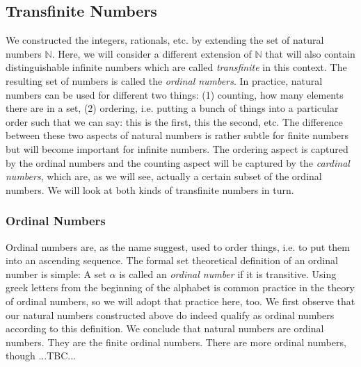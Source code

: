 





\subsection{Transfinite Numbers}
We constructed the integers, rationals, etc. by extending the set of natural numbers $\mathbb{N}$. Here, we will consider a different extension of $\mathbb{N}$ that will also contain distinguishable infinite numbers which are called \emph{transfinite} in this context. The resulting set of numbers is called the \emph{ordinal numbers}. In practice, natural numbers can be used for different two things: (1) counting, how many elements there are in a set, (2) ordering, i.e. putting a bunch of things into a particular order such that we can say: this is the first, this the second, etc. The difference between these two aspects of natural numbers is rather subtle for finite numbers but will become important for infinite numbers. The ordering aspect is captured by the ordinal numbers and the counting aspect will be captured by the \emph{cardinal numbers}, which are, as we will see, actually a certain subset of the ordinal numbers. We will look at both kinds of transfinite numbers in turn.





\subsubsection{Ordinal Numbers}
Ordinal numbers are, as the name suggest, used to order things, i.e. to put them into an ascending sequence. The formal set theoretical definition of an ordinal number is simple: A set $\alpha$ is called an \emph{ordinal number} if it is transitive. Using greek letters from the beginning of the alphabet is common practice in the theory of ordinal numbers, so we will adopt that practice here, too. We first observe that our natural numbers constructed above do indeed qualify as ordinal numbers according to this definition. We conclude that natural numbers are ordinal numbers. They are the finite ordinal numbers. There are more ordinal numbers, though ...TBC...

